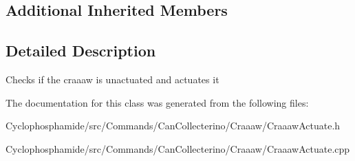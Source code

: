 \subsection*{Additional Inherited Members}


\subsection{Detailed Description}
Checks if the craaaw is unactuated and actuates it 

The documentation for this class was generated from the following files\+:\begin{DoxyCompactItemize}
\item 
Cyclophosphamide/src/\+Commands/\+Can\+Collecterino/\+Craaaw/Craaaw\+Actuate.\+h\item 
Cyclophosphamide/src/\+Commands/\+Can\+Collecterino/\+Craaaw/Craaaw\+Actuate.\+cpp\end{DoxyCompactItemize}
